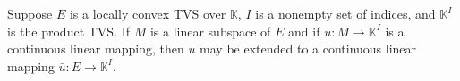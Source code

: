 Suppose $E$ is a locally convex TVS over $\mathbb{K}$, $I$ is a nonempty set of indices, and $\mathbb{K}^I$ is the product TVS. If $M$ is a linear subspace of $E$ and if $u: M \rightarrow \mathbb{K}^I$ is a continuous linear mapping, then $u$ may be extended to a continuous linear mapping $\bar{u}: E \rightarrow \mathbb{K}^I$.